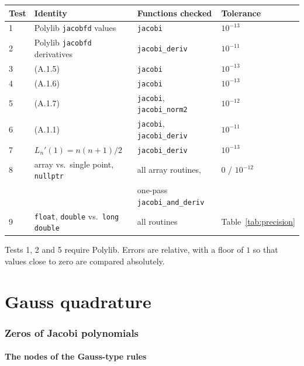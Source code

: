 \documentclass[11pt,a4paper]{article}
\newcommand{\code}[1]{\texttt{#1}}
\begin{document}
\begin{center}
\begin{tabular}{@{}llll@{}}
\toprule
Test & Identity & Functions checked & Tolerance \\
\midrule
1 & Polylib \code{jacobfd} values & \code{jacobi} & $10^{-13}$ \\
2 & Polylib \code{jacobfd} derivatives & \code{jacobi\_deriv} & $10^{-11}$ \\
3 & (A.1.5) & \code{jacobi} & $10^{-13}$ \\
4 & (A.1.6) & \code{jacobi} & $10^{-13}$ \\
5 & (A.1.7) & \code{jacobi}, \code{jacobi\_norm2} & $10^{-12}$ \\
6 & (A.1.1) & \code{jacobi}, \code{jacobi\_deriv} & $10^{-11}$ \\
7 & $L_n'(1)=n(n+1)/2$ & \code{jacobi\_deriv} & $10^{-13}$ \\
8 & array vs.\ single point, \code{nullptr} & all array routines, & $0$ / $10^{-12}$ \\
  & & one-pass \code{jacobi\_and\_deriv} & \\
9 & \code{float}, \code{double} vs.\ \code{long double} & all routines & Table~\ref{tab:precision} \\
\bottomrule
\end{tabular}
\end{center}
Tests 1, 2 and 5 require Polylib. Errors are relative, with a floor of $1$
so that values close to zero are compared absolutely.

\part{Gauss quadrature}
\section{Zeros of Jacobi polynomials}
\label{sec:zeros}

\subsection{The nodes of the Gauss-type rules}
\end{document}
